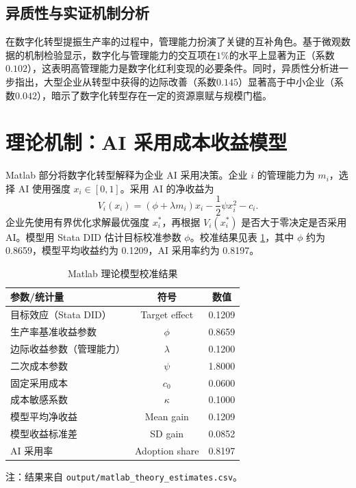 \documentclass[11pt]{ctexart}
\begin{document}
\subsection{异质性与实证机制分析}
在数字化转型提振生产率的过程中，管理能力扮演了关键的互补角色。基于微观数据的机制检验显示，数字化与管理能力的交互项在$1\%$的水平上显著为正（系数$0.102$），这表明高管理能力是数字化红利变现的必要条件。同时，异质性分析进一步指出，大型企业从转型中获得的边际改善（系数$0.145$）显著高于中小企业（系数$0.042$），暗示了数字化转型存在一定的资源禀赋与规模门槛。

\section{理论机制：AI 采用成本收益模型}

Matlab 部分将数字化转型解释为企业 AI 采用决策。企业 $i$ 的管理能力为 $m_i$，选择 AI 使用强度 $x_i \in [0,1]$。采用 AI 的净收益为
\begin{equation}
V_i(x_i) = (\phi + \lambda m_i)x_i - \frac{1}{2}\psi x_i^2 - c_i.
\end{equation}
企业先使用有界优化求解最优强度 $x_i^*$，再根据 $V_i(x_i^*)$ 是否大于零决定是否采用 AI。模型用 Stata DID 估计目标校准参数 $\phi$。校准结果见表 \ref{tab:theory-calibration}，其中 $\phi$ 约为 0.8659，模型平均收益约为 0.1209，AI 采用率约为 0.8197。

\begin{table}[htbp]
\centering
\caption{Matlab 理论模型校准结果}
\label{tab:theory-calibration}
\begin{tabular}{lcc}
\toprule
参数/统计量 & 符号 & 数值 \\
\midrule
目标效应（Stata DID） & Target effect & 0.1209 \\
生产率基准收益参数 & $\phi$ & 0.8659 \\
边际收益参数（管理能力） & $\lambda$ & 0.1200 \\
二次成本参数 & $\psi$ & 1.8000 \\
固定采用成本 & $c_0$ & 0.0600 \\
成本敏感系数 & $\kappa$ & 0.1000 \\
模型平均净收益 & Mean gain & 0.1209 \\
模型收益标准差 & SD gain & 0.0852 \\
AI 采用率 & Adoption share & 0.8197 \\
\bottomrule
\end{tabular}
\begin{flushleft}
\footnotesize 注：结果来自 \texttt{output/matlab\_theory\_estimates.csv}。
\end{flushleft}
\end{table}
\end{document}
